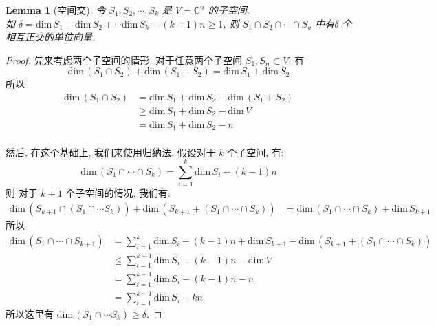 \documentclass{article}
\newtheorem{lemma}{Lemma}
\def\dim{\mathrm{dim}\,}
\begin{document}
\begin{lemma}[空间交]
  令 $S_1, S_2, \cdots, S_k$ 是 $V = \mathbb{C}^n$ 的子空间.\\ 
  如 $\delta = \dim S_1 + \dim S_2 + \cdots \dim S_k - (k-1)n \geq 1$, 
  则 $S_1 \cap S_2 \cap \cdots \cap S_k$ 中有$\delta$ 个相互正交的单位向量.
\end{lemma}
\begin{proof}
  先来考虑两个子空间的情形.
  对于任意两个子空间 $S_1, S_n \subset V$, 有
  \[\dim (S_1\cap S_2) + \dim (S_1 + S_2) = \dim S_1 + \dim S_2\]
  所以
  \begin{align*}
    \dim (S_1 \cap S_2) &= \dim S_1 + \dim S_2 - \dim (S_1 + S_2) \\
                        &\geq \dim S_1 + \dim S_2 - \dim V \\
                        &= \dim S_1 + \dim S_2 - n
  \end{align*} \\

  然后, 在这个基础上, 我们来使用归纳法.
  假设对于 $k$ 个子空间, 有:
  \[\dim (S_1 \cap \cdots \cap S_k) = \sum_{i=1}^k \dim S_i - (k - 1)n\]
  则 对于 $k+1$ 个子空间的情况, 我们有:
  \begin{align*}
    \dim(S_{k+1}\cap (S_1 \cap \cdots S_k)) + \dim (S_{k+1} + (S_1 \cap \cdots \cap S_k)) &= \dim (S_1\cap \cdots \cap S_k) + \dim S_{k+1} 
  \end{align*}
  所以 
  \begin{align*}
    \dim(S_1 \cap \cdots \cap S_{k+1}) &= \sum_{i=1}^k \dim S_i - (k - 1)n + \dim S_{k+1} - \dim(S_{k+1}  + (S_1 \cap \cdots \cap S_k)) \\
    &\leq \sum_{i=1}^{k+1} \dim S_i - (k - 1)n  - \dim V \\
    &= \sum_{i=1}^{k+1} \dim S_i - (k - 1)n - n \\
    &= \sum_{i=1}^{k+1} \dim S_i - kn
  \end{align*}
  所以这里有 $\dim (S_1 \cap \cdots S_k) \geq \delta$.
\end{proof}
\end{document}
